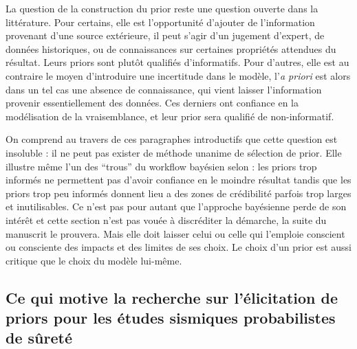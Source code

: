 
La question de la construction du prior reste une question ouverte dans la littérature. %
Pour certains, elle est l'opportunité d'ajouter de l'information provenant d'une source extérieure, il peut s'agir d'un jugement d'expert, de données historiques, ou de connaissances sur certaines propriétés attendues du résultat. Leurs priors sont plutôt qualifiés d'informatifs.
Pour d'autres, elle est au contraire le moyen d'introduire une incertitude dans le modèle, l'\emph{a priori} est alors dans un tel cas une absence de connaissance, qui vient laisser l'information provenir essentiellement des données. Ces derniers ont confiance en la modélisation de la vraisemblance, et leur prior sera qualifié de non-informatif.


On comprend au travers de ces paragraphes introductifs que cette question est insoluble : il ne peut pas exister de méthode unanime de sélection de prior. Elle illustre même l'un des ``trous'' du workflow bayésien selon \citet{gelman_holes_2020} : les priors trop informés ne permettent pas d'avoir confiance en le moindre résultat tandis que les priors trop peu informés %
donnent lieu a des zones de crédibilité parfois trop larges et inutilisables.
Ce n'est pas pour autant que l'approche bayésienne perde de son intérêt et cette section n'est pas vouée à discréditer la démarche, la suite du manuscrit le prouvera. %
Mais elle doit laisser celui ou celle qui l'emploie conscient ou consciente des impacts et des limites de ses choix. Le choix d'un prior est aussi critique que le choix du modèle lui-même.














\subsection{Ce qui motive la recherche sur l'élicitation de priors pour les études sismiques probabilistes de sûreté}

